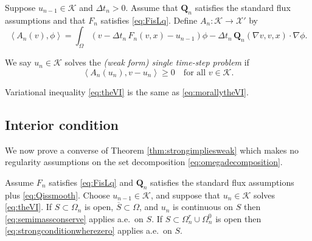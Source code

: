 \documentclass[final,onefignum]{siamart190516}
\newcommand\bQ{\mathbf{Q}}
\newcommand{\grad}{\nabla}
\newcommand{\ip}[2]{\ensuremath{\left<#1,#2\right>}}
\begin{document}
\begin{definition}  Suppose $u_{n-1}\in\mathcal{K}$ and $\Delta t_n>0$.  Assume that $\bQ_n$ satisfies the standard flux assumptions and that $F_n$ satisfies \eqref{eq:FisLq}.  Define $A_n:\mathcal{K} \to \mathcal{X}'$ by
\begin{equation}
  \ip{A_n(v)}{\phi} = \int_\Omega \left(v - \Delta t_n\, F_n(v,x) - u_{n-1}\right)\phi - \Delta t_n\, \bQ_n(\grad v,v,x) \cdot \grad\phi. \label{eq:defineAn}
\end{equation}
\end{definition}

\begin{definition}  We say $u_n\in\mathcal{K}$ solves the \emph{(weak form) single time-step problem} if
\begin{equation}
  \ip{A_n(u_n)}{v-u_n} \ge 0 \quad \text{for all } v \in \mathcal{K}.  \label{eq:theVI}
\end{equation}
\end{definition}

Variational inequality \eqref{eq:theVI} is the same as \eqref{eq:morallytheVI}.


\subsection{Interior condition}  \label{subsec:interior}  We now prove a converse of Theorem \ref{thm:strongimpliesweak} which makes no regularity assumptions on the set decomposition \eqref{eq:omegadecomposition}.

\begin{theorem} \label{thm:weakimpliesstrong}  Assume $F_n$ satisfies \eqref{eq:FisLq} and $\bQ_n$ satisfies the standard flux assumptions plus \eqref{eq:Qissmooth}.  Choose $u_{n-1}\in\mathcal{K}$, and suppose that $u_n\in\mathcal{K}$ solves \eqref{eq:theVI}.  If $S \subset \Omega_n$ is open, $\overline{S}\subset \Omega$, and $u_n$ is continuous on $S$ then \eqref{eq:semimassconserve} applies a.e.~on $S$.  If $S \subset \Omega_n^r \cup \Omega_n^0$ is open then \eqref{eq:strongconditionwherezero} applies a.e.~on $S$.
\end{theorem}
\end{document}
